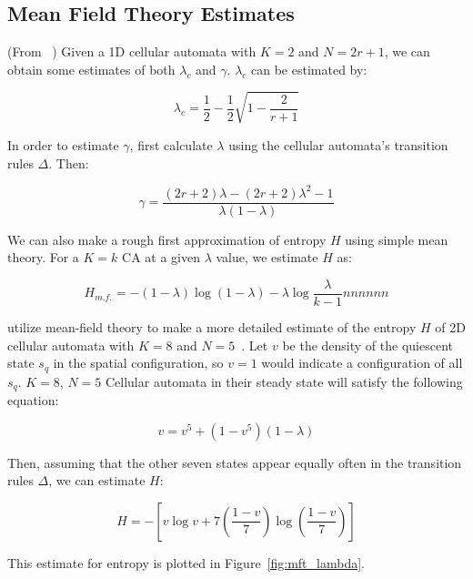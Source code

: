 \documentclass[a4paper,11pt,twoside]{report}
\begin{document}
\begin{appendices}
\section{Mean Field Theory Estimates}
\label{appA:MFT}
(From \citeauthor{li90b}~\cite{li90b}) Given a 1D cellular automata with $K=2$ and $N = 2r+1$, we can obtain some estimates of both $\lambda_c$ and $\gamma$. $\lambda_c$ can be estimated by:

\begin{equation}
\lambda_c = \frac{1}{2} - \frac{1}{2}\sqrt{1 - \frac{2}{r+1}}
\end{equation}

In order to estimate $\gamma$, first calculate $\lambda$ using the cellular automata's transition rules $\Delta$. Then:

\begin{equation}
\gamma = \frac{(2r+2)\lambda - (2r + 2)\lambda^2 - 1}{\lambda(1-\lambda)}
\end{equation}

We can also make a rough first approximation of entropy $H$ using simple mean theory. For a $K=k$ CA at a given $\lambda$ value, we estimate $H$ as:

\begin{equation}
H_{m.f.} = - (1- \lambda) \log (1-\lambda) - \lambda \log \frac{\lambda}{k-1}nnnnnn
\end{equation}

\citeauthor{wo90} utilize mean-field theory to make a more detailed estimate of the entropy $H$ of 2D cellular automata with $K=8$ and $N=5$~\cite{wo90}. Let $v$ be the density of the quiescent state $s_q$ in the spatial configuration, so $v=1$ would indicate a configuration of all $s_q$. $K=8$, $N=5$ Cellular automata in their steady state will satisfy the following equation:

\begin{equation}
v = v^5 + (1 - v^5)(1- \lambda)
\end{equation}

Then, assuming that the other seven states appear equally often in the transition rules $\Delta$, we can estimate $H$:

\begin{equation}
H = -\left[ v \log v + 7\left(\frac{1-v}{7}\right)\log\left(\frac{1-v}{7}\right)\right]
\end{equation}

This estimate for entropy is plotted in Figure~\ref{fig:mft_lambda}.


\end{appendices}
\end{document}
